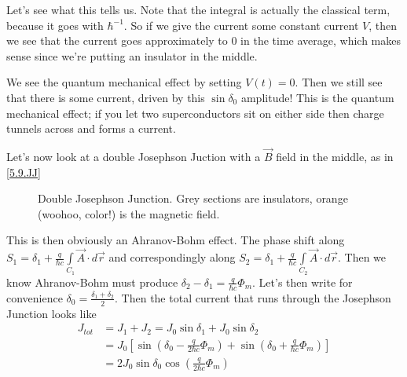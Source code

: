 \documentclass[10pt]{report}
\begin{document}
Let's see what this tells us. Note that the integral is actually the classical term, because it goes with $\hbar^{-1}$. So if we give the current some constant current $V$, then we see that the current goes approximately to $0$ in the time average, which makes sense since we're putting an insulator in the middle.

We see the quantum mechanical effect by setting $V(t) = 0$. Then we still see that there is some current, driven by this $\sin\delta_0$ amplitude! This is the quantum mechanical effect; if you let two superconductors sit on either side then charge tunnels across and forms a current.

Let's now look at a double Josephson Juction with a $\vec{B}$ field in the middle, as in \eqref{5.9.JJ}
\begin{figure}[!h]
    \centering
    \caption{Double Josephson Junction. Grey sections are insulators, orange (woohoo, color!) is the magnetic field.}
    \label{5.9.JJ}
\end{figure}

This is then obviously an Ahranov-Bohm effect. The phase shift along $S_1 = \delta_1 + \frac{q}{\hbar c}\int\limits_{C_1}\vec{A} \cdot d\vec{r}$ and correspondingly along $S_2 = \delta_1 + \frac{q}{\hbar c}\int\limits_{C_2}\vec{A} \cdot d\vec{r}$. Then we know Ahranov-Bohm must produce $\delta_2 - \delta_1 = \frac{q}{\hbar c}\Phi_m$. Let's then write for convenience $\delta_0 = \frac{\delta_1 + \delta_2}{2}$. Then the total current that runs through the Josephson Junction looks like
\begin{align}
    J_{tot} &= J_1 + J_2 = J_0\sin \delta_1 + J_0\sin \delta_2\\
    &= J_0\left[ \sin\left( \delta_0 - \frac{q}{2\hbar c}\Phi_m \right) + \sin \left( \delta_0 + \frac{q}{\hbar c}\Phi_m \right) \right]\\
    &= 2J_0\sin \delta_0 \cos\left( \frac{q}{2\hbar c}\Phi_m \right)
\end{align}
\end{document}

